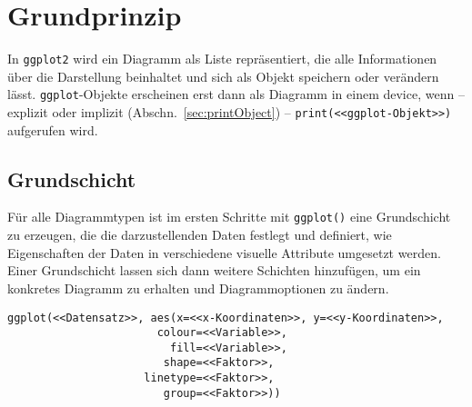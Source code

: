 \section{Grundprinzip}

In \lstinline!ggplot2! wird ein Diagramm als Liste repräsentiert, die alle Informationen über die Darstellung beinhaltet und sich als Objekt speichern oder verändern lässt. \lstinline!ggplot!-Objekte erscheinen erst dann als Diagramm in einem device, wenn -- explizit oder implizit (Abschn.\ \ref{sec:printObject}) -- \lstinline!print(<<ggplot-Objekt>>)! aufgerufen wird.

\subsection{Grundschicht}

Für alle Diagrammtypen ist im ersten Schritte mit \lstinline!ggplot()! eine Grundschicht zu erzeugen, die die darzustellenden Daten festlegt und definiert, wie Eigenschaften der Daten in verschiedene visuelle Attribute umgesetzt werden. Einer Grundschicht lassen sich dann weitere Schichten hinzufügen, um ein konkretes Diagramm zu erhalten und Diagrammoptionen zu ändern.%
\begin{lstlisting}
ggplot(<<Datensatz>>, aes(x=<<x-Koordinaten>>, y=<<y-Koordinaten>>,
                       colour=<<Variable>>,
                         fill=<<Variable>>,
                        shape=<<Faktor>>,
                     linetype=<<Faktor>>,
                        group=<<Faktor>>))
\end{lstlisting}

